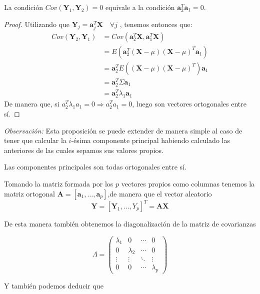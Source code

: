 \begin{propo}
La condición $Cov(\textbf{Y}_1,\textbf{Y}_2)=0 $ equivale a la condición $\textbf{a}_2^T\textbf{a}_1 = 0$.

\begin{proof}
Utilizando que $\textbf{Y}_j=\textbf{a}_j^T \textbf{X}\quad \forall j$ , tenemos entonces que:
\begin{align*}
Cov(\textbf{Y}_2,\textbf{Y}_1)&= Cov (\textbf{a}_2^T\textbf{X},\textbf{a}_1^T\textbf{X})\\ 
&= E(\textbf{a}_2^T(\textbf{X}-\mu)(\textbf{X}-\mu)^T \textbf{a}_1)\\
&= \textbf{a}_2^T E((\textbf{X}-\mu)(\textbf{X}-\mu)^T) \textbf{a}_1\\
&= \textbf{a}_2^T \Sigma \textbf{a}_1 \\
&= \textbf{a}_2^T \lambda_1 \textbf{a}_1
\end{align*}
\noindent De manera que, si $a_2^T \lambda_1 a_1 = 0 \Rightarrow a_2^T a_1=0 $, luego son vectores ortogonales entre sí.
\end{proof}
\end{propo}
\noindent \emph{Observación: } Esta proposición se puede extender de manera simple al caso de tener que calcular la $i$-ésima componente principal habiendo calculado las anteriores de las cuales sepamos sus valores propios. 

\begin{coro}
Las componentes principales son todas ortogonales entre sí. 
\end{coro}

\noindent Tomando la matriz formada por los $p$ vectores propios como columnas tenemos la matriz ortogonal $\textbf{A}=[\textbf{a}_1,\ldots, \textbf{a}_p]$,de manera que el vector aleatorio 
$$\textbf{Y}=[\textbf{Y}_1,\ldots , Y_p]^T=\textbf{A}\textbf{X}$$

De esta manera también obtenemos la diagonalización de la matriz de covarianzas 

\begin{equation}
\Lambda=\begin{pmatrix}
\lambda_1 & 0 & \cdots & 0\\
0 & \lambda_2 & \cdots & 0\\
\vdots & \vdots & \ddots & \vdots\\
0 & 0 & \cdots & \lambda_p
\end{pmatrix}
\end{equation}

Y también podemos deducir que 

